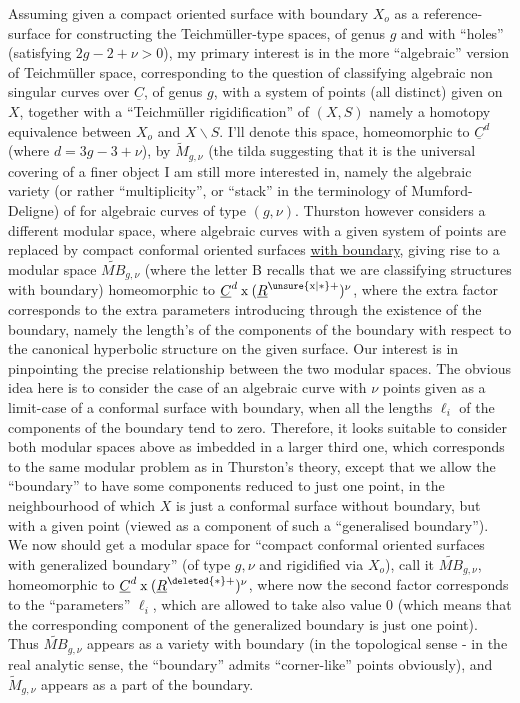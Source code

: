 Assuming given a compact oriented surface with boundary $X_o$  as a reference-surface for constructing the Teichmüller-type spaces, of genus $g$ and with \hspace{0.5cm} ``holes'' (satisfying $2g-2+\nu>0$), my primary interest is in the more ``algebraic'' version of Teichmüller space, corresponding to the question of classifying algebraic non singular curves over $\underline{C}$, of genus $g$, with a system of \hspace{0.5cm} points (all distinct) given on $X$, together with a ``Teichmüller rigidification'' of $(X,S)$ namely a homotopy equivalence between $X_o$ and $X\backslash S$. I'll denote this space, homeomorphic to $\underline{C}^{d}$ (where $d=3g-3+\nu$), by $\widetilde M_{g,\nu}$ (the tilda suggesting that it is the universal covering of a finer object I am still more interested in, namely the algebraic variety (or rather ``multiplicity'', or ``stack'' in the terminology of Mumford-Deligne) of  for algebraic curves of type $(g,\nu)$.
Thurston however considers a different modular space, where algebraic curves with a given system of points are replaced by compact conformal oriented surfaces \uline{with boundary}, giving rise to a modular space $\widetilde{MB}_{g,\nu}$ (where the letter B recalls that we are classifying structures with boundary) homeomorphic to $\underline{C}^{d}\mathbin{\mathrm{x}}(\underline{R}^{\unsure{\mathrm{x}|*}+})^{\nu}$, where the extra factor  corresponds to the extra parameters introducing through the existence of the boundary, namely the length's of the  components of the boundary with respect to the canonical hyperbolic structure on the given surface. Our interest is in pinpointing the precise relationship between the two modular spaces. The obvious idea here is to consider the case of an algebraic curve with $\nu$ points given as a limit-case of a  conformal surface with boundary, when all the lengths $\ell_i$ of the components of the boundary tend to zero. Therefore, it looks suitable to consider both modular spaces above as imbedded in a larger third one, which corresponds to the same modular problem as in Thurston's theory, except that we allow the ``boundary'' to have some components reduced to just one point, in the neighbourhood of which $X$ is just a conformal surface without boundary, but with a given point
(viewed as a component of such a ``generalised boundary''). We now should  get a modular space for ``compact conformal oriented surfaces with generalized boundary'' (of type $g,\nu$ and rigidified via $X_o$), call it $\widetilde{MB}_{g,\nu}$, homeomorphic to $\underline C^d\mathbin{\mathrm{x}}(\underline R^{\deleted{*}+})^{\nu}$, where now the second factor corresponds to  the ``parameters'' $\ell_i$, which are allowed to take also value $0$ (which means that the corresponding component of the generalized boundary is just one point). Thus $\widetilde{MB}_{g,\nu}$ appears as a variety with boundary (in the topological sense - in the real analytic sense, the ``boundary'' admits ``corner-like'' points obviously), and $\widetilde M_{g,\nu}$ appears as a part of the boundary.

